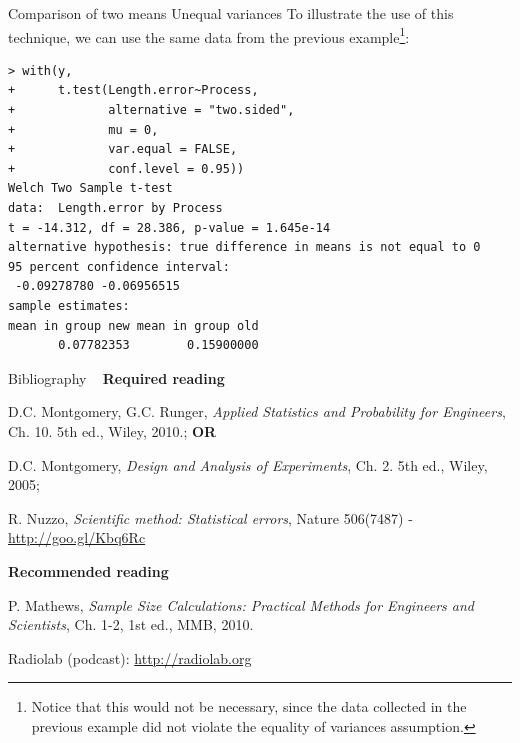 \documentclass[t]{beamer}
\begin{document}

\begin{ftstf}
{Comparison of two means}
{Unequal variances}
To illustrate the use of this technique, we can use the same data from the previous example\footnote[2]{Notice that this would not be necessary, since the data collected in the previous example did not violate the equality of variances assumption.}:
\vhalf
\begin{Verbatim}[fontsize=\scriptsize]
> with(y,
+      t.test(Length.error~Process,
+             alternative = "two.sided",
+             mu = 0,
+             var.equal = FALSE,
+             conf.level = 0.95))
Welch Two Sample t-test
data:  Length.error by Process
t = -14.312, df = 28.386, p-value = 1.645e-14
alternative hypothesis: true difference in means is not equal to 0
95 percent confidence interval:
 -0.09278780 -0.06956515
sample estimates:
mean in group new mean in group old 
       0.07782353        0.15900000 
\end{Verbatim}
\vone
\end{ftstf}









\begin{ftst}
{Bibliography}
{\ }
\scriptsize
\textbf{Required reading}

\benums D.C. Montgomery, G.C. Runger, \textit{Applied Statistics and Probability for Engineers}, Ch. 10. 5th ed., Wiley, 2010.; \textbf{OR}
\item D.C. Montgomery, \textit{Design and Analysis of Experiments}, Ch. 2. 5th ed., Wiley, 2005;
\item R. Nuzzo, \textit{Scientific method: Statistical errors}, Nature 506(7487) - \url{http://goo.gl/Kbq6Rc}
\eenum

\textbf{Recommended reading}

\benums P. Mathews, \textit{Sample Size Calculations: Practical Methods for Engineers and Scientists}, Ch. 1-2, 1st ed., MMB, 2010.
\item Radiolab (podcast): \url{http://radiolab.org}
\eenum
\end{ftst}

\end{document}
